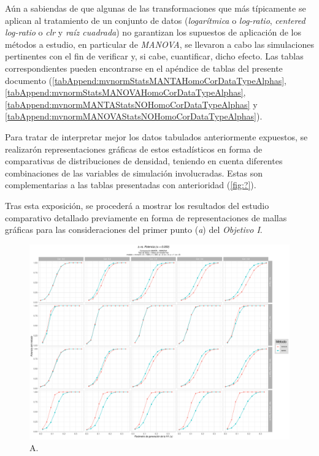 \documentclass[IB,BIB]{TFUOC}%
\begin{document}
Aún a sabiendas de que algunas de las transformaciones que más típicamente se aplican al tratamiento de un conjunto de datos (\textit{logarítmica} o \textit{log-ratio}, \textit{centered log-ratio} o \textit{clr} y \textit{raíz cuadrada}) no garantizan los supuestos de aplicación de los métodos a estudio, en particular de \textit{MANOVA}, se llevaron a cabo las simulaciones pertinentes con el fin de verificar y, si cabe, cuantificar, dicho efecto. Las tablas correspondientes pueden encontrarse en el apéndice de tablas del presente documento (\ref{tabAppend:mvnormStatsMANTAHomoCorDataTypeAlphas}, \ref{tabAppend:mvnormStatsMANOVAHomoCorDataTypeAlphas}, \ref{tabAppend:mvnormMANTAStatsNOHomoCorDataTypeAlphas} y \ref{tabAppend:mvnormMANOVAStatsNOHomoCorDataTypeAlphas}).

Para tratar de interpretar mejor los datos tabulados anteriormente expuestos, se realizarón representaciones gráficas de estos estadísticos en forma de comparativas de distribuciones de densidad, teniendo en cuenta diferentes combinaciones de las variables de simulación involucradas. Estas son complementarias a las tablas presentadas con anterioridad (\ref{fig:?}).





Tras esta exposición, se procederá a mostrar los resultados del estudio comparativo detallado previamente en forma de representaciones de mallas gráficas para las consideraciones del primer punto (\textit{a}) del \textit{Objetivo I}.

\begin{figure}[!htbp]
    \centering
    \includegraphics[scale=.45]{OBJ1a005.pdf}
    \caption{\scriptsize{A.}}
    \label{fig:OBJ1a005}
\end{figure}
\end{document}
